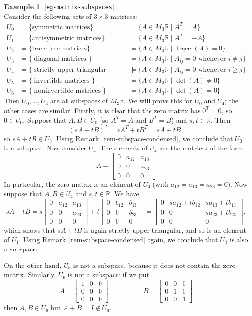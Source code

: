 \documentclass{amsart}
\newcommand{\lbl}[1]{\label{#1}\textup{[\texttt{#1}]}\ \\}
\newcommand{\lbl}{\label}
\newcommand{\R}         {{\mathbb{R}}}
\newcommand{\trc}       {\operatorname{trace}}
\newcommand{\bbm}       {\left[\begin{matrix}}
\newcommand{\ebm}       {\end{matrix}\right]}
\newcommand{\bsm}       {\left[\begin{smallmatrix}}
\newcommand{\esm}       {\end{smallmatrix}\right]}
\newcommand{\tm}        {\times}
\newcommand{\st}        {\;|\;}
\renewcommand{\:}       {\colon}
\theoremstyle{definition}
\newtheorem{example}[theorem]{Example}
\begin{document}
\begin{example}\lbl{eg-matrix-subspaces}
 Consider the following sets of $3\tm 3$ matrices:
 \begin{align*}
   U_0 &= \{ \text{symmetric matrices} \} 
       &&= \{ A\in M_3\R \st A^T = A \} \\
   U_1 &= \{ \text{antisymmetric matrices} \}
       &&= \{ A\in M_3\R \st A^T = -A \} \\
   U_2 &= \{ \text{trace-free matrices} \} 
       &&= \{ A\in M_3\R \st \trc(A) = 0 \} \\
   U_3 &= \{ \text{ diagonal matrices } \} 
       &&= \{ A\in M_3\R \st A_{ij}=0 \text{ whenever } i\neq j\} \\
   U_4 &= \{ \text{ strictly upper-triangular matrices } \} 
       &&= \{ A\in M_3\R \st A_{ij}=0 \text{ whenever } i\geq j\} \\
   U_5 &= \{ \text{ invertible matrices } \} 
       &&= \{ A\in M_3\R \st \det(A) \neq 0 \} \\
   U_6 &= \{ \text{ noninvertible matrices } \} 
       &&= \{ A\in M_3\R \st \det(A) = 0 \}
 \end{align*}
 Then $U_0,\ldots,U_4$ are all subspaces of $M_3\R$.  We
 will prove this for $U_0$ and $U_4$; the other cases are
 similar.  Firstly, it is clear that the zero matrix has
 $0^T=0$, so $0\in U_0$.  Suppose that $A,B\in U_0$
 (so $A^T=A$ and $B^T=B$) and $s,t\in\R$.  Then 
 \[ (sA+tB)^T = sA^T+tB^T = sA + tB, \]
 so $sA+tB\in U_0$.  Using
 Remark~\ref{rem-subspace-condensed}, we conclude that $U_0$
 is a subspace.  Now consider $U_4$.  The elements of $U_4$
 are the matrices of the form
 \[ A = \bbm 0 & a_{12} & a_{13} \\
             0 & 0      & a_{23} \\
             0 & 0      & 0  \ebm
 \]
 In particular, the zero matrix is an element of $U_4$ (with
 $a_{12}=a_{13}=a_{23}=0$).  Now suppose that $A,B\in U_4$
 and $s,t\in\R$.  We have 
 \[ sA + tB = 
    s \bbm 0& a_{12}& a_{13}\\ 0 &0 & a_{23}\\0&0&0\ebm +
    t \bbm 0& b_{12}& b_{13}\\ 0 &0 & b_{23}\\0&0&0\ebm =
    \bbm 0 & s a_{12} + t b_{12} & s a_{13} + t b_{13} \\
         0 & 0                   & s a_{23} + t b_{23} \\
         0 & 0                   & 0 \ebm,
 \]
 which shows that $sA+tB$ is again strictly upper
 triangular, and so is an element of $U_4$.  Using
 Remark~\ref{rem-subspace-condensed} again, we conclude that
 $U_4$ is also a subspace.

 On the other hand, $U_5$ is not a subspace, because it does
 not contain the zero matrix.  Similarly, $U_6$ is not a
 subspace: if we put
 \[ A = \bsm 1&0&0\\0&0&0\\0&0&0 \esm 
    \hspace{5em} 
    B = \bsm 0&0&0\\0&1&0\\0&0&1 \esm 
 \]
 then $A,B\in U_6$ but $A+B=I\not\in U_6$.
\end{example}
\end{document}
